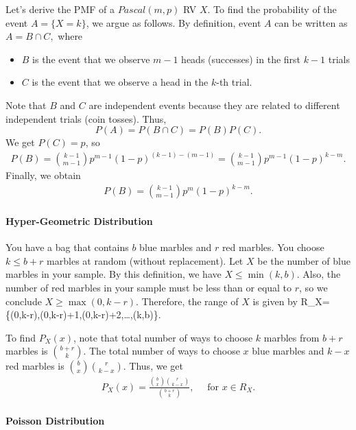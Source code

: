 Let's derive the PMF of a $Pascal(m,p)$ RV $X$. To find the probability of the event $A = \{X=k\}$, we argue as follows. By definition, event $A$ can be written as $A=B\cap C,$ where
\begin{itemize}
	\item $B$ is the event that we observe $m-1$ heads (\ie successes) in the first $k-1$ trials
	\item $C$ is the event that we observe a head in the $k$-th trial.
\end{itemize}

Note that $B$ and $C$ are independent events because they are related to different independent trials (coin tosses). Thus,
$$P(A)=P(B\cap C) = P(B)P(C).$$
We get $P(C) = p$, so 
\begin{align*}
	P(B) = \binom{k-1}{m-1}p^{m-1}(1-p)^{(k-1)-(m-1)} = \binom{k-1}{m-1}p^{m-1}(1-p)^{k-m}.
\end{align*}
Finally, we obtain
\begin{align*}
	P(B) = \binom{k-1}{m-1}p^{m}(1-p)^{k-m}.
\end{align*}

\paragraph{Hyper-Geometric Distribution}
You have a bag that contains $b$ blue marbles and $r$ red marbles. You choose $k\leq b+r$ marbles at random (without replacement). Let $X$ be the number of blue marbles in your sample. By this definition, we have $X\leq \min(k,b)$. Also, the number of red marbles in your sample must be less than or equal to $r$, so we conclude $X\geq \max(0,k-r)$. Therefore, the range of $X$ is given by R_X=\{\max(0,k-r),\max(0,k-r)+1,\max(0,k-r)+2,\dots,\min(k,b)\}.

To find $P_X(x)$, note that total number of ways to choose $k$ marbles from $b+r$ marbles is $\binom{b+r}{k}$. The total number of ways to choose $x$ blue marbles and $k-x$ red marbles is $\binom{b}{x}\binom{r}{k-x}$. Thus, we get
\begin{align*}
	P_X(x)= \frac{{b \choose x} {r \choose k-x}}{{b+r \choose k}}, \quad \text{ for } x \in R_X.
\end{align*}
\paragraph{Poisson Distribution}

